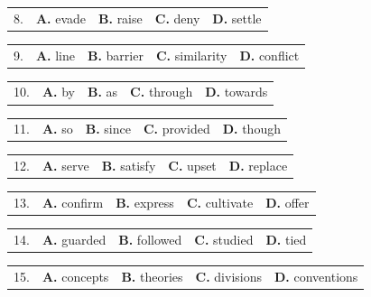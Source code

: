 \documentclass[UTF8,11pt]{ctexart}
\begin{document}
\noindent\begin{tabularx}{\linewidth}{@{}lXXXX@{}}8. & \textbf{A.} evade & \textbf{B.} raise & \textbf{C.} deny & \textbf{D.} settle\\\end{tabularx}\par

\noindent\begin{tabularx}{\linewidth}{@{}lXXXX@{}}9. & \textbf{A.} line & \textbf{B.} barrier & \textbf{C.} similarity & \textbf{D.} conflict\\\end{tabularx}\par

\noindent\begin{tabularx}{\linewidth}{@{}lXXXX@{}}10. & \textbf{A.} by & \textbf{B.} as & \textbf{C.} through & \textbf{D.} towards\\\end{tabularx}\par

\noindent\begin{tabularx}{\linewidth}{@{}lXXXX@{}}11. & \textbf{A.} so & \textbf{B.} since & \textbf{C.} provided & \textbf{D.} though\\\end{tabularx}\par

\noindent\begin{tabularx}{\linewidth}{@{}lXXXX@{}}12. & \textbf{A.} serve & \textbf{B.} satisfy & \textbf{C.} upset & \textbf{D.} replace\\\end{tabularx}\par

\noindent\begin{tabularx}{\linewidth}{@{}lXXXX@{}}13. & \textbf{A.} confirm & \textbf{B.} express & \textbf{C.} cultivate & \textbf{D.} offer\\\end{tabularx}\par

\noindent\begin{tabularx}{\linewidth}{@{}lXXXX@{}}14. & \textbf{A.} guarded & \textbf{B.} followed & \textbf{C.} studied & \textbf{D.} tied\\\end{tabularx}\par

\noindent\begin{tabularx}{\linewidth}{@{}lXXXX@{}}15. & \textbf{A.} concepts & \textbf{B.} theories & \textbf{C.} divisions & \textbf{D.} conventions\\\end{tabularx}\par
\end{document}
